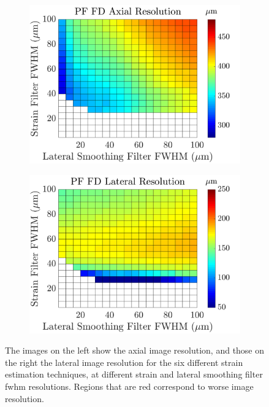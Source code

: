 {\begin{figure}[h!]
\begin{subfigure}{0.49\textwidth}
		\includegraphics[width=\textwidth]{imageres_figs/pffd_axial.png}
	\end{subfigure}
	\begin{subfigure}{0.49\textwidth}
		\centering
		\includegraphics[width=\textwidth]{imageres_figs/pffd_lateral.png}
	\end{subfigure}
	\caption{The images on the left show the axial image resolution, and those on the right the lateral image resolution for the six different strain estimation techniques, at different strain and lateral smoothing filter \ac{fwhm} resolutions. Regions that are red correspond to worse image resolution.}
	\label{imageres_figs}
\end{figure}

\clearpage
}

